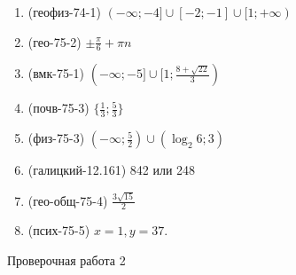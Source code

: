 \documentclass[11pt,a5paper]{report}
\begin{document}
\newpage

\begin{enumerate}

\item (геофиз-74-1) $(-\infty; -4] \cup [-2; -1] \cup [1; +\infty)$

\item (гео-75-2) $\pm \frac{\pi}{6} + \pi n$

\item (вмк-75-1) $(-\infty; -5] \cup [1; \frac{8+\sqrt{22}}{3})$

\item (почв-75-3) $\{ \frac{1}{3}; \frac{5}{3} \}$

\item (физ-75-3) $(-\infty; \frac52) \cup (\log_2 6; 3)$

\item (галицкий-12.161) 842 или 248

\item (гео-общ-75-4) $\frac{3 \sqrt{15}}{2}$

\item (псих-75-5) $x=1, y=37$.

\end{enumerate}
\newpage

\begin{center}
Проверочная работа 2


\end{center}
\end{document}

